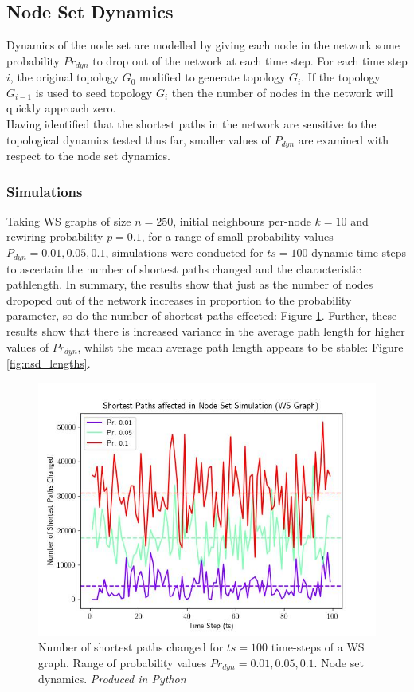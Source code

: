 \documentclass[
	a4paper, %
	10pt, %
	unnumberedsections, %
	twoside, %
]{LTJournalArticle}
\begin{document}
\subsection{Node Set Dynamics}
Dynamics of the node set are modelled by giving each node in the network some probability \(Pr_{dyn}\) to drop out of the network at each time step. For each time step \(i\), the original topology \(G_{0}\) modified to generate topology \(G_{i}\). If the topology \(G_{i-1}\) is used to seed topology \(G_{i}\) then the number of nodes in the network will quickly approach zero. \\

Having identified that the shortest paths in the network are sensitive to the topological dynamics tested thus far, smaller values of \(P_{dyn}\) are examined with respect to the node set dynamics. \\

\subsubsection{Simulations} 
Taking WS graphs of size \(n = 250\), initial neighbours per-node  \(k = 10\) and rewiring probability \(p = 0.1\), for a range of small probability values \(P_{dyn} = 0.01, 0.05, 0.1\), simulations were conducted for \(ts = 100\) dynamic time steps to ascertain the number of shortest paths changed and the characteristic pathlength. In summary, the results show that just as the number of nodes dropoped out of the network increases in proportion to the probability parameter, so do the number of shortest paths effected: Figure \ref{fig:nsd_paths}. Further, these results show that there is increased variance in the average path length for higher values of \(Pr_{dyn}\), whilst the mean average path length appears to be stable: Figure \ref{fig:nsd_lengths}. \\

\begin{figure}[H]
	\includegraphics[width=\linewidth]{Figures/nsd/NS_ex1_paths_mean.jpg}
	\caption{Number of shortest paths changed for \(ts = 100\) time-steps of a WS graph. Range of probability values \(Pr_{dyn} = 0.01, 0.05, 0.1\). Node set dynamics. \emph{Produced in Python}}
	\label{fig:nsd_paths}
\end{figure}
\end{document}
